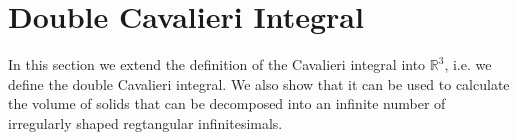 \documentclass{article}
\theoremstyle{theorem}
\theoremstyle{definition}
\begin{document}
% 
% 

\section{Double Cavalieri Integral}
In this section we extend the definition of the Cavalieri integral into $\mathbb{R}^3$, i.e. we define the double Cavalieri integral. We also show that it can be used to calculate the volume of solids that can be decomposed into an infinite 
number of irregularly shaped regtangular infinitesimals.\\
\end{document}
